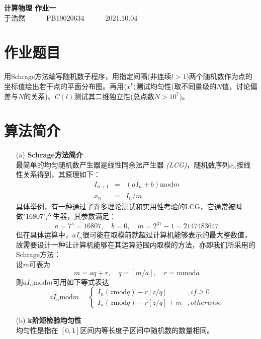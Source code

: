 \documentclass[12pt,a4paper,utf8]{ctexart}
\begin{document}
\begin{center}
    {\LARGE\textbf{计算物理 作业一}}\\
    \textrm{于浩然}~~~~~~\textrm{PB19020634}~~~~~~\textrm{2021.10.04}
\end{center}
\section{作业题目}
用Schrage方法编写随机数子程序，用指定间隔(非连续$l>1$)两个随机数作为点的坐标值绘出若干点的平面分布图。再用$\langle
x^k
\rangle$测试均匀性(取不同量级的$N$值，讨论偏差与$N$的关系)、$C(l)$测试其二维独立性(总点数$N>10^7$)。
\section{算法简介}
\begin{enumerate}
    \item[(a)] \textbf{Schrage方法简介}\\
最简单的均匀随机数产生器是线性同余法产生器
\textsl{(LCG)}，随机数序列${x_n}$按线性关系得到，其原理如下：\\
\begin{eqnarray}
    I_{n+1}&=&(aI_n+b)\mathrm{mod} m \\
    x_n&=&I_n/m
\end{eqnarray}
具体举例，有一种通过了许多理论测试和实用性考验的LCG，它通常被叫做"16807"产生器，其参数满足：
\begin{equation}
    a=7^5=16807,\quad b=0,\quad m=2^{31}-1=2147483647
\end{equation}
但在具体运算中，$aI_n$很可能在取模前就超过计算机能够表示的最大整数值，故需要设计一种让计算机能够在其运算范围内取模的方法，亦即我们所采用的Schrage方法：\\
设$m$可表为
\begin{equation}
    m=aq+r,\quad q=[m/a],\quad r= m\mathrm{mod} a
\end{equation}
则$aI_n\mathrm{mod}m$可用如下等式表达
\begin{equation}
    aI_n\mathrm{mod} m=\left\{
    \begin{aligned}
        I_n(z\mathrm{mod} q)-r[z/q]\qquad &,if\geqslant 0 \\
        I_n(z\mathrm{mod} q)-r[z/q]+m &,otherwise
    \end{aligned}
    \right.
\end{equation}
    \item[(b)] \textbf{k阶矩检验均匀性}\\
        均匀性是指在 $[0,1]$区间内等长度子区间中随机数的数量相同。

\end{enumerate}
\end{document}
